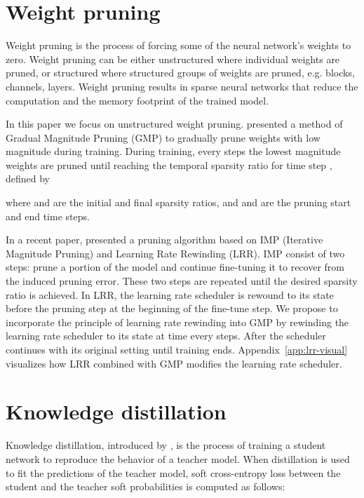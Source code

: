 \documentclass{article}
\begin{document}
\section{Weight pruning}
\label{sec:weight-pruning}
Weight pruning is the process of forcing some of the neural network's weights to zero.
Weight pruning can be either unstructured where individual weights are pruned, or structured where structured groups of weights are pruned, e.g. blocks, channels, layers.
Weight pruning results in sparse neural networks that reduce the computation and the memory footprint of the trained model.

In this paper we focus on unstructured weight pruning.
\citet{zhu2017prune} presented a method of Gradual Magnitude Pruning (GMP) to gradually prune weights with low magnitude during training.
During training, every  steps the lowest magnitude weights are pruned until reaching the temporal sparsity ratio  for time step , defined by

where  and  are the initial and final sparsity ratios, and  and  are the pruning start and end time steps.

In a recent paper, \citet{renda2020rewind} presented a pruning algorithm based on IMP (Iterative Magnitude Pruning) \citep{han2015imp} and Learning Rate Rewinding (LRR).
IMP consist of two steps: prune a portion of the model and continue fine-tuning it to recover from the induced pruning error.
These two steps are repeated until the desired sparsity ratio is achieved.
In LRR, the learning rate scheduler is rewound to its state before the pruning step at the beginning of the fine-tune step.
We propose to incorporate the principle of learning rate rewinding into GMP by rewinding the learning rate scheduler to its state at time  every  steps.
After  the scheduler continues with its original setting until training ends.
Appendix~\ref{app:lrr-visual} visualizes how LRR combined with GMP modifies the learning rate scheduler.

\section{Knowledge distillation}
\label{sec:kd}
Knowledge distillation, introduced by \citet{hinton2015distilling}, is the process of training a student network to reproduce the behavior of a teacher model. When distillation is used to fit the predictions of the teacher model, soft cross-entropy loss between the student and the teacher soft probabilities is computed as follows:
\end{document}

